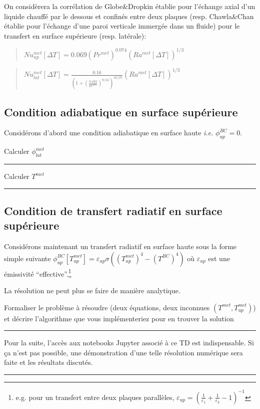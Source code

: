 \documentclass[3p]{elsarticle}
\newenvironment{remark}[1][\textit{Nota Bene}]{\begin{trivlist}
\item[\hskip \labelsep {\bfseries \rule{1ex}{1ex} #1}]\ignorespaces}{\rule{1ex}{1ex} \end{trivlist}\ignorespacesafterend}
\newcounter{question}
\newcommand{\Q}[1]{\stepcounter{question}\begin{remark}[Q\arabic{question}]#1~~\end{remark}}
\begin{document}
On considèrera la corrélation de Globe\&Dropkin \cite{Globe1959} établie pour l'échange axial d’un liquide chauffé par le dessous et confinés entre deux plaques (resp. Chawla\&Chan \cite{Chawla1982} établie pour l'échange d’une paroi verticale immergée dans un fluide) pour le transfert en surface supérieure (resp. latérale):
\begin{quote}
\(Nu^{met}_{up}\left[\Delta T\right]=0.069\left(Pr^{met}\right)^{0.074}\left(Ra^{met}\left[\Delta T\right]\right)^{1/3}\)
\end{quote}
\begin{quote}
\(Nu^{met}_{lat}\left[\Delta T\right]=\frac{0.16}{\left(1+\left(\frac{0.492}{Pr^{met}}\right)^{9/16}\right)^{16/27}}\left(Ra^{met}\left[\Delta T\right]\right)^{1/3}\)
\end{quote}

\subsection{Condition adiabatique en surface supérieure}

Considérons d'abord une condition adiabatique en surface haute \textit{i.e.} \(\phi^{BC}_{up}=0\).

\Q{Calculer \(\phi_{lat}^{met}\)}
\Q{Calculer \(T^{met}\)}
 
\subsection{Condition de transfert radiatif en surface supérieure} \label{sect:rad}

Considérons maintenant un transfert radiatif en surface haute sous la forme simple suivante \(\phi^{BC}_{up}\left[T^{met}_{up}\right]=\varepsilon_{up}\sigma\left(\left(T^{met}_{up}\right)^4-\left(T^{BC}\right)^4\right)\)
où \(\varepsilon_{up}\) est une émissivité ``effective''.\footnote{e.g. pour un transfert entre deux plaques parallèles, \(\varepsilon_{up}=\left(\frac{1}{\varepsilon_1}+\frac{1}{\varepsilon_2}-1\right)^{-1}\)}

La résolution ne peut plus se faire de manière analytique.

\Q{Formaliser le problème à résoudre (deux équations, deux inconnues \(\left(T^{met},T_{up}^{met}\right)\)) et décrire l'algorithme que vous implémenteriez pour en trouver la solution}

\begin{remark} Pour la suite, l'accès aux notebooks Jupyter associé à ce TD est indispensable. Si ça n'est pas possible, une démonstration d'une telle résolution numérique sera faite et les résultats discutés. \end{remark}
\end{document}
